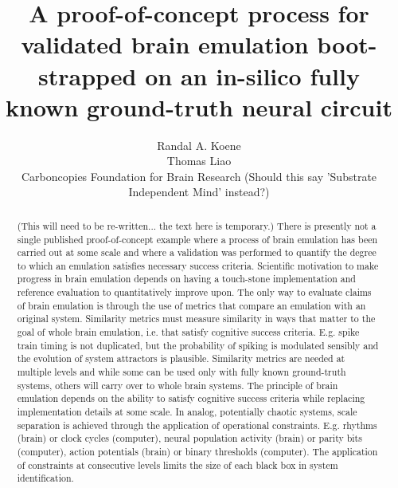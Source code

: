 \documentclass{ldr-article}
\title{A proof-of-concept process for validated brain emulation boot-strapped on an in-silico fully known ground-truth neural circuit}
\author{
Randal A. Koene\\
Thomas Liao\\
Carboncopies Foundation for Brain Research (Should this say 'Substrate Independent Mind' instead?)
}
\begin{document}
    \maketitle

    \begin{abstract}
       (This will need to be re-written... the text here is temporary.)
       There is presently not a single published proof-of-concept example where a process of brain emulation has been carried out at some scale and where a validation was performed to quantify the degree to which an emulation satisfies necessary success criteria. Scientific motivation to make progress in brain emulation depends on having a touch-stone implementation and reference evaluation to quantitatively improve upon. The only way to evaluate claims of brain emulation is through the use of metrics that compare an emulation with an original system. Similarity metrics must measure similarity in ways that matter to the goal of whole brain emulation, i.e. that satisfy cognitive success criteria. E.g. spike train timing is not duplicated, but the probability of spiking is modulated sensibly and the evolution of system attractors is plausible. Similarity metrics are needed at multiple levels and while some can be used only with fully known ground-truth systems, others will carry over to whole brain systems. The principle of brain emulation depends on the ability to satisfy cognitive success criteria while replacing implementation details at some scale. In analog, potentially chaotic systems, scale separation is achieved through the application of operational constraints. E.g. rhythms (brain) or clock cycles (computer), neural population activity (brain) or parity bits (computer), action potentials (brain) or binary thresholds (computer). The application of constraints at consecutive levels limits the size of each black box in system identification.
    \end{abstract}
    
\end{document}
